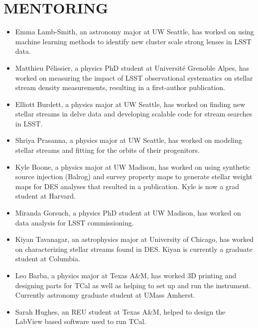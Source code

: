 \documentclass[11pt,letterpaper, sans]{moderncv}        %
\begin{document}
\section{MENTORING}
\begin{itemize} [itemsep=1pt, leftmargin=65pt]
    \item [2026-present] Emma Lamb-Smith, an astronomy major at UW Seattle, has worked on using machine learning methods to identify new cluster scale strong lenses in LSST data.
    \item [2025-present] Matthieu Pélissier, a physics PhD student at Université Grenoble Alpes, has worked on measuring the impact of LSST observational systematics on stellar stream density measurements, resulting in a first-author publication.
    \item [2024-present] Elliott Burdett, a physics major at UW Seattle, has worked on finding new stellar streams in delve data and developing scalable code for stream searches in LSST.
    \item [2024-present] Shriya Prasanna, a physics major at UW Seattle, has worked on modeling stellar streams and fitting for the orbits of their progenitors.
    \item [2022-2025] Kyle Boone, a physics major at UW Madison, has worked on using synthetic source injection (Balrog) and survey property maps to generate stellar weight maps for DES analyses that resulted in a publication. Kyle is now a grad student at Harvard. 
    \item [2023-2024] Miranda Gorsuch, a physics PhD student at UW Madison, has worked on data analysis for LSST commissioning.
    \item [2020-2021] Kiyan Tavanagar, an astrophysics major at University of Chicago, has worked on characterizing stellar streams found in DES. Kiyan is currently a graduate student at Columbia.   
    \item [2018-2021] Leo Barba, a physics major at Texas A\&M, has worked 3D printing and designing parts for TCal as well as helping to set up and run the instrument. Currently astronomy graduate student at UMass Amherst.  
    \item [2018] Sarah Hughes, an REU student at Texas A\&M, helped to design the LabView based software used to run TCal.  
\end{itemize}
\end{document}
